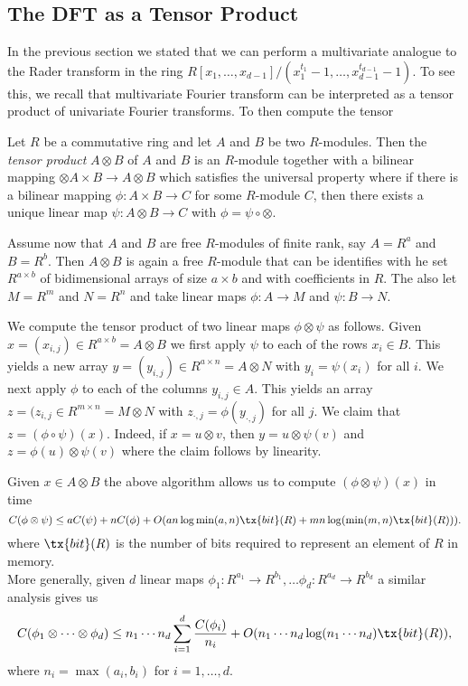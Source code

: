 \subsection{The DFT as a Tensor Product}%
\label{sub:the_dft_as_a_tensor_product}



In the previous section we stated that we can perform a multivariate analogue to the Rader transform in the ring $R[x_1, \ldots, x_{d-1}] / (x_1^{t_1} - 1, \ldots, x_{d-1}^{t_{d-1}} - 1)$. To see this, we recall that multivariate Fourier transform can be interpreted as a tensor product of univariate Fourier transforms. To then compute the tensor 

Let $R$ be a commutative ring and let $A$ and $B$ be two $R$-modules. Then the \emph{tensor product} $A \otimes B$ of $A$ and $B$ is an $R$-module together with a bilinear mapping $\otimes A \times B \to A \otimes B$ which satisfies the universal property where if there is a bilinear mapping $\phi: A \times B \to C$ for some $R$-module $C$, then there exists a unique linear map $\psi: A \otimes B \to C$ with $\phi = \psi \circ \otimes$.

Assume now that $A$ and $B$ are free $R$-modules of finite rank, say $A = R^a$ and $B = R^b$. Then $A \otimes B$ is again a free $R$-module that can be identifies with he set $R^{a \times b}$ of bidimensional arrays of size $a \times b$ and with coefficients in $R$. The also let $M = R^m$ and $N = R^n$ and take linear maps $\phi: A \to M$ and $\psi : B \to N$.

We compute the tensor product of two linear maps $\phi \otimes \psi$ as follows. Given $x = (x_{i,j}) \in R^{a \times b} = A \otimes B$ we first apply $\psi$ to each of the rows $x_i \in B$. This yields a new array $y = (y_{i, j}) \in R^{a \times n} = A \otimes N$ with $y_i = \psi(x_i)$ for all $i$. We next apply $\phi$ to each of the columns $y_{i, j} \in A$. This yields an array $z = (z_{i, j} \in R^{m \times n} = M \otimes N$ with $z_{\cdot , j} = \phi(y_{\cdot, j})$ for all $j$. We claim that $z = (\phi \circ \psi)(x)$. Indeed, if $x = u \otimes v$, then $y = u \otimes \psi(v)$ and $z = \phi(u) \otimes \psi(v)$ where the claim follows by linearity.

Given $x \in A \otimes B$ the above algorithm allows us to compute $(\phi \otimes \psi) (x)$ in time
\[
    C(\phi \otimes \psi) \leq aC(\psi) + nC(\phi) + O(a n \log \min(a, n) \tx{bit}(R) + m n \log( \min (m, n)\tx{bit}(R))).
\]
where $\tx{bit}(R)$ is the number of bits required to represent an element of $R$ in memory.\\
More generally, given $d$ linear maps $\phi_1: R^{a_1} \to R^{b_1}, \ldots \phi_d: R^{a_d} \to R^{b_d}$ a similar analysis gives us
\[
    C(\phi_1 \otimes \cdots \otimes \phi_d) \leq n_1\cdots n_d \sum^d_{i = 1} \frac{C(\phi_i)}{n_i} + O(n_1\cdots n_d \log (n_1 \cdots n_d) \tx{bit}(R)),
\]
where $n_i = \max(a_i, b_i)$ for $i = 1, \ldots, d$.


